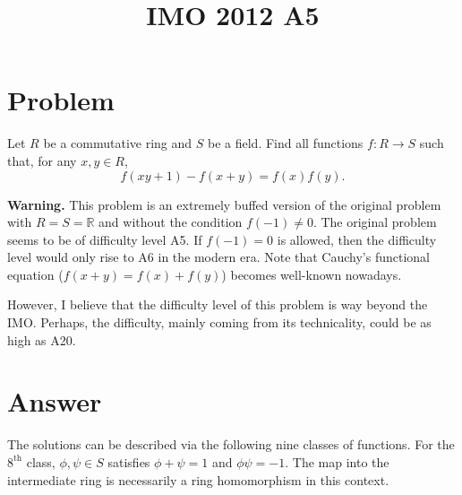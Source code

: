 \documentclass{article}
\title{IMO 2012 A5}
\author{}
\date{}
\newcommand{\R}{\mathbb{R}}
\begin{document}
\maketitle





\section*{Problem}

Let $R$ be a commutative ring and $S$ be a field.
Find all functions $f : R \to S$ such that, for any $x, y \in R$,
\[ f(xy + 1) - f(x + y) = f(x) f(y). \tag{*}\label{2012a5-eq0} \]

\textbf{Warning.}
This problem is an extremely buffed version of the original problem with $R = S = \R$ and without the condition $f(-1) \neq 0$.
The original problem seems to be of difficulty level A5.
If $f(-1) = 0$ is allowed, then the difficulty level would only rise to A6 in the modern era.
Note that Cauchy's functional equation ($f(x + y) = f(x) + f(y)$) becomes well-known nowadays.

However, I believe that the difficulty level of this problem is way beyond the IMO.
Perhaps, the difficulty, mainly coming from its technicality, could be as high as A20.









\section*{Answer}

The solutions can be described via the following nine classes of functions.
For the $8^{\text{th}}$ class, $\phi, \psi \in S$ satisfies $\phi + \psi = 1$ and $\phi \psi = -1$.
The map into the intermediate ring is necessarily a ring homomorphism in this context.
\end{document}
